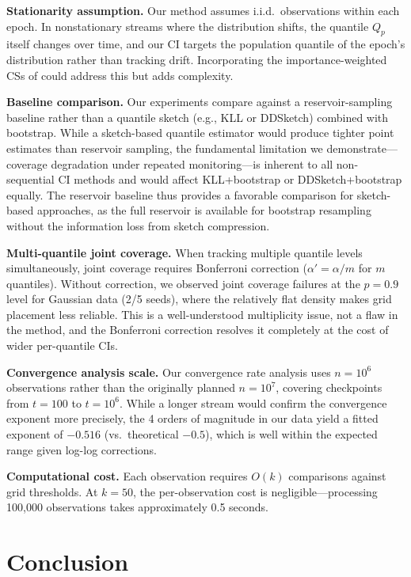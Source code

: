 \documentclass{article}
\newcommand{\Qp}{Q_p}
\begin{document}
\textbf{Stationarity assumption.} Our method assumes i.i.d.\ observations within each epoch. In nonstationary streams where the distribution shifts, the quantile $\Qp$ itself changes over time, and our CI targets the population quantile of the epoch's distribution rather than tracking drift. Incorporating the importance-weighted CSs of \citet{mineiro2023time} could address this but adds complexity.

\textbf{Baseline comparison.} Our experiments compare against a reservoir-sampling baseline rather than a quantile sketch (e.g., KLL or DDSketch) combined with bootstrap. While a sketch-based quantile estimator would produce tighter point estimates than reservoir sampling, the fundamental limitation we demonstrate---coverage degradation under repeated monitoring---is inherent to all non-sequential CI methods and would affect KLL+bootstrap or DDSketch+bootstrap equally. The reservoir baseline thus provides a favorable comparison for sketch-based approaches, as the full reservoir is available for bootstrap resampling without the information loss from sketch compression.

\textbf{Multi-quantile joint coverage.} When tracking multiple quantile levels simultaneously, joint coverage requires Bonferroni correction ($\alpha' = \alpha/m$ for $m$ quantiles). Without correction, we observed joint coverage failures at the $p = 0.9$ level for Gaussian data (2/5 seeds), where the relatively flat density makes grid placement less reliable. This is a well-understood multiplicity issue, not a flaw in the method, and the Bonferroni correction resolves it completely at the cost of wider per-quantile CIs.

\textbf{Convergence analysis scale.} Our convergence rate analysis uses $n = 10^6$ observations rather than the originally planned $n = 10^7$, covering checkpoints from $t = 100$ to $t = 10^6$. While a longer stream would confirm the convergence exponent more precisely, the 4 orders of magnitude in our data yield a fitted exponent of $-0.516$ (vs.\ theoretical $-0.5$), which is well within the expected range given log-log corrections.

\textbf{Computational cost.} Each observation requires $O(k)$ comparisons against grid thresholds. At $k = 50$, the per-observation cost is negligible---processing 100{,}000 observations takes approximately 0.5 seconds.

\section{Conclusion}
\label{sec:conclusion}
\end{document}
